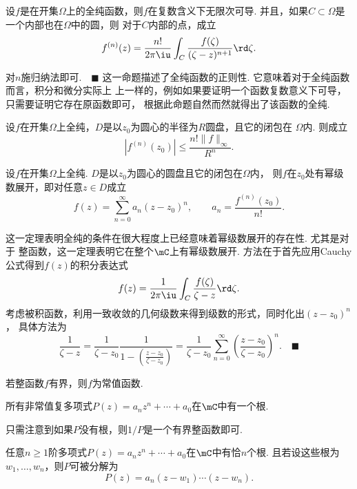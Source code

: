   \begin{cor}[Cauchy]
    \label{cor: Cauchy}
    设$f$是在开集$\Omega$上的全纯函数，则$f$在复数含义下无限次可导.
    并且，如果$C\subset\Omega$是一个内部也在$\Omega$中的圆，则
    对于$C$内部的点，成立
    \[
      f^{(n)}(z) = \frac{n!}{2\pi\iu}\int_C\frac{f(\zeta)}{(\zeta-z)^{n+1}}\rd\zeta.
    \]
  \end{cor}
  \proof
    对$n$施归纳法即可.$\quad\blacksquare$
  \remark
    这一命题描述了全纯函数的正则性. 它意味着对于全纯函数而言，积分和微分实际上
    上一样的，例如如果要证明一个函数复数意义下可导，只需要证明它存在原函数即可，
    根据此命题自然而然就得出了该函数的全纯.

  \begin{cor}
    设$f$在开集$\Omega$上全纯，$D$是以$z_0$为圆心的半径为$R$圆盘，且它的闭包在
    $\Omega$内. 则成立
    \[
      |f^{(n)}(z_0)| \le \frac{n!\|f\|_\infty}{R^n}.
    \]
  \end{cor}

  \begin{thm}[幂级数展开]
    设$f$在开集$\Omega$上全纯. $D$是以$z_0$为圆心的圆盘且它的闭包在$\Omega$内，
    则$f$在$z_0$处有幂级数展开，即对任意$z\in D$成立
    \[
      f(z) = \sum_{n=0}^\infty a_n(z-z_0)^n,\qquad
      a_n = \frac{f^{(n)}(z_0)}{n!}.
    \]
  \end{thm}
  \remark
    这一定理表明全纯的条件在很大程度上已经意味着幂级数展开的存在性. 尤其是对于
    整函数，这一定理表明它在整个$\mC$上有幂级数展开.
  \proof
    方法在于首先应用Cauchy公式得到$f(z)$的积分表达式
    \[
      f(z) = \frac{1}{2\pi\iu}\int_C\frac{f(\zeta)}{\zeta-z}\rd\zeta.
    \]
    考虑被积函数，利用一致收敛的几何级数来得到级数的形式，同时化出$(z-z_0)^n$，
    具体方法为
    \[
      \frac{1}{\zeta-z} = \frac{1}{\zeta-z_0}\frac{1}{1-(\frac{z-z_0}{\zeta-z_0})}
      = \frac{1}{\zeta-z_0}\sum_{n=0}^\infty\left(\frac{z-z_0}{\zeta-z_0}\right)^n.
      \quad\blacksquare
    \]

  \begin{cor}[Liouville]
    若整函数$f$有界，则$f$为常值函数.
  \end{cor}

  \begin{cor}
    所有非常值复多项式$P(z)=a_nz^n + \cdots + a_0$在$\mC$中有一个根.
  \end{cor}
  \proof
    只需注意到如果$P$没有根，则$1/P$是一个有界整函数即可.

  \begin{cor}
    任意$n\ge 1$阶多项式$P(z)=a_nz^n + \cdots + a_0$在$\mC$中有恰$n$个根.
    且若设这些根为$w_1,\dots,w_n$，则$P$可被分解为
    \[
      P(z) = a_n(z-w_1)\cdots(z-w_n).
    \]
  \end{cor}
  \proof

